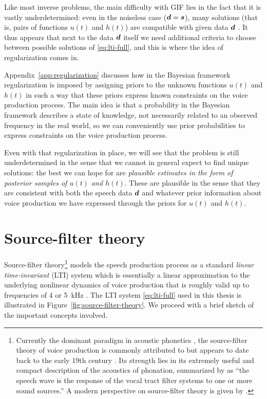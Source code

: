\begin{chaptersections}
Like most inverse problems, the main difficulty with GIF lies in the fact that it is vastly underdetermined: even in the noiseless case (${\bm d} = {\bm s}$), many solutions (that is, pairs of functions $u(t)$ and $h(t)$) are compatible with given data ${\bm d}$ \citep{Landau1983}.
It thus appears that next to the data ${\bm d}$ itself we need additional criteria to choose between possible solutions of \eqref{eq:lti-full}, and this is where the idea of regularization comes in.

Appendix~\ref{app:regularization} discusses how in the Bayesian framework regularization is imposed by assigning priors to the unknown functions $u(t)$ and $h(t)$ in such a way that these priors express known constraints on the voice production process.
The main idea is that a probability in the Bayesian framework describes a state of knowledge, not necessarily related to an observed frequency in the real world, so we can conveniently use prior probabilities to express constraints on the voice production process.

Even with that regularization in place, we will see that the problem is still underdetermined in the sense that we cannot in general expect to find unique solutions: the best we can hope for are \emph{plausible estimates in the form of posterior samples of $u(t)$ and $h(t)$}.
These are plausible in the sense that they are consistent with both the speech data ${\bm d}$ and whatever prior information about voice production we have expressed through the priors for $u(t)$ and $h(t)$.

\section{Source-filter theory\label{sec:source-filter-theory}}


Source-filter theory\footnote{%
Currently the dominant paradigm in acoustic phonetics \citep{Maurer2016},
the source-filter theory of voice production is commonly attributed to \cite{Fant1960} but appears to date back to the early 19th century \citep{Chen2016}.
Its strength lies in its extremely useful and compact description of the acoustics of phonation, summarized by \cite[][p. 15]{Fant1960} as ``the speech wave is the response of the vocal tract filter systems to one or more sound sources.''
A modern perspective on source-filter theory is given by \cite{Svec2021}.
} models the speech production process as a standard \emph{linear time-invariant} (LTI) system \citep{Antsaklis2006} which is essentially a linear approximation to the underlying nonlinear dynamics of voice production that is roughly valid up to frequencies of 4 or 5~kHz \citep{Doval2006}.
The LTI system \eqref{eq:lti-full} used in this thesis is illustrated in Figure~\ref{fig:source-filter-theory}.
We proceed with a brief sketch of the important concepts involved.


\end{chaptersections}
